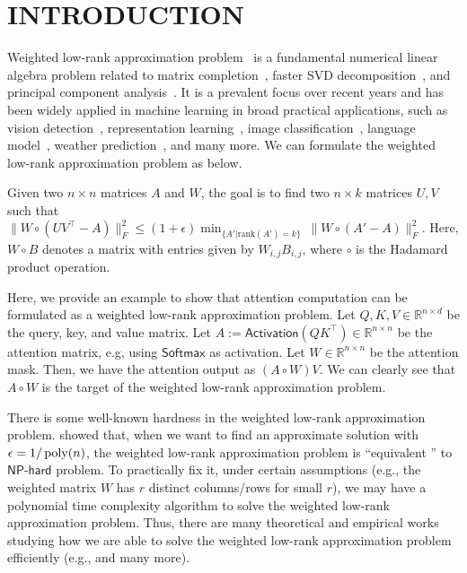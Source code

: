\section{INTRODUCTION}\label{sec:intro}
Weighted low-rank approximation problem~\citep{sj03} is a fundamental numerical linear algebra problem related to matrix completion~\citep{llr16}, faster SVD decomposition~\citep{bjs14,bks16}, and principal component analysis~\citep{xxf+21}. 
It is a prevalent focus over recent years and has been widely applied in machine learning in broad practical applications, such as vision detection~\citep{cxt22}, representation learning~\citep{wwz+19}, image classification~\citep{pcp+23}, language model~\citep{hhc+21}, weather prediction~\citep{wtl18}, and many more.
We can formulate the weighted low-rank approximation problem as below.
\begin{definition}
Given two $n \times n$ matrices $A$ and $W$, the goal is to find two $n \times k$ matrices $U,V$ such that $\| W \circ (UV^\top - A) \|_F^2 \leq (1+\epsilon) \min_{\{A' | \mathrm{rank}(A')=k \}} ~ \| W \circ (A' - A ) \|_F^2$. Here, $W\circ B$ denotes a matrix with entries given by $W_{i,j} B_{i,j}$, where $\circ$ is the Hadamard product operation.
\end{definition}

Here, we provide an example to show that attention computation can be formulated as a weighted low-rank approximation problem. 
Let $Q, K, V \in \mathbb{R}^{n \times d}$ be the query, key, and value matrix. Let $A := \mathsf{Activation}(Q K^\top) \in \mathbb{R}^{n \times n}$ be the attention matrix, e.g, using $\mathsf{Softmax}$ as activation. Let $W \in \mathbb{R}^{n \times n}$ be the attention mask. Then, we have the attention output as $(A \circ W) V$. We can clearly see that $A \circ W$ is the target of the weighted low-rank approximation problem.

There is some well-known hardness in the weighted low-rank approximation problem. \cite{gg11,rsw16} showed that, when we want to find an approximate solution with $\epsilon = 1/\operatorname{poly}(n)$, the weighted low-rank approximation problem is ``equivalent '' to $\mathsf{NP}$-$\mathsf{hard}$ problem.   
To practically fix it, under certain assumptions (e.g., the weighted matrix $W$ has $r$ distinct columns/rows for small $r$), we may have a polynomial time complexity algorithm to solve the weighted low-rank approximation problem.
Thus, there are many theoretical and empirical works studying how we are able to solve the weighted low-rank approximation problem efficiently (e.g., \cite{ev12,zqz+19,syyz23,wy24} and many more).  

